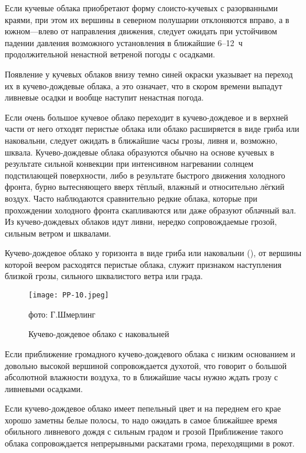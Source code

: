  Если кучевые облака приобретают форму слоисто-кучевых с
разорванными краями, при этом их вершины в северном полушарии
отклоняются вправо, а в южном—влево от направления движения, следует
ожидать при устойчивом падении давления возможного установления в
ближайшие 6--12~ч продолжительной ненастной ветреной погоды с
осадками.

 Появление у кучевых облаков внизу темно синей окраски указывает
на переход их в кучево-дождевые облака, а это означает, что в скором
времени выпадут ливневые осадки и вообще наступит ненастная погода.

 Если очень большое кучевое облако переходит в кучево-дождевое и
в верхней части от него отходят перистые облака или облако расширяется
в виде гриба или наковальни, следует ожидать в ближайшие часы грозы,
ливня и, возможно, шквала. Кучево-дождевые облака образуются обычно на
основе кучевых в результате сильной конвекции при интенсивном
нагревании солнцем подстилающей поверхности, либо в результате
быстрого движения холодного фронта, бурно вытесняющего вверх тёплый,
влажный и относительно лёгкий воздух. Часто наблюдаются сравнительно
редкие облака, которые при прохождении холодного фронта скапливаются
или даже образуют облачный вал. Из кучево-дождевых облаков идут ливни,
нередко сопровождаемые грозой, сильным ветром и шквалами.

 Кучево-дождевое облако у горизонта в виде гриба или наковальни
(), от вершины которой веером расходятся перистые облака,
служит признаком наступления близкой грозы, сильного шквалистого ветра
или града.

\begin{figure}[htb]
  \centering{}
  \texttt{[image: PP-10.jpeg]}
  \caption{Кучево-дождевое облако с наковальней}
  \label{fig:pp10}
  \small
  \centering{}фото: Г.Шмерлинг
\end{figure}


 Если приближение громадного кучево-дождевого облака с низким
основанием и довольно высокой вершиной сопровождается духотой, что
говорит о большой абсолютной влажности воздуха, то в ближайшие часы
нужно ждать грозу с ливневыми осадками.

 Если кучево-дождевое облако имеет пепельный цвет и на переднем
его крае хорошо заметны белые полосы, то надо ожидать в самое
ближайшее время обильного ливневого дождя с сильным градом и грозой
Приближение такого облака сопровождается непрерывными раскатами грома,
переходящими в рокот.

